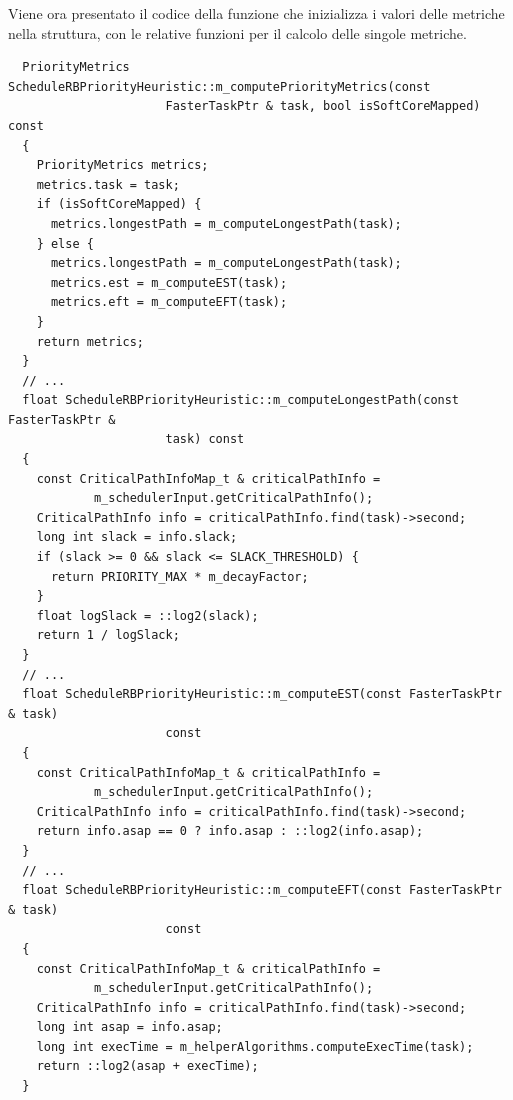 Viene ora presentato il codice della funzione che inizializza i valori delle 
metriche nella struttura, con le relative funzioni per il calcolo delle singole 
metriche.
\newline
\begin{verbatim}
  PriorityMetrics ScheduleRBPriorityHeuristic::m_computePriorityMetrics(const 
                      FasterTaskPtr & task, bool isSoftCoreMapped) const
  {
    PriorityMetrics metrics;
    metrics.task = task;
    if (isSoftCoreMapped) {
      metrics.longestPath = m_computeLongestPath(task);
    } else {
      metrics.longestPath = m_computeLongestPath(task);
      metrics.est = m_computeEST(task);
      metrics.eft = m_computeEFT(task);
    }
    return metrics;
  }
  // ...
  float ScheduleRBPriorityHeuristic::m_computeLongestPath(const FasterTaskPtr & 
                      task) const
  {
    const CriticalPathInfoMap_t & criticalPathInfo = 
            m_schedulerInput.getCriticalPathInfo();
    CriticalPathInfo info = criticalPathInfo.find(task)->second;
    long int slack = info.slack;
    if (slack >= 0 && slack <= SLACK_THRESHOLD) {
      return PRIORITY_MAX * m_decayFactor;
    }
    float logSlack = ::log2(slack);
    return 1 / logSlack;
  }
  // ...
  float ScheduleRBPriorityHeuristic::m_computeEST(const FasterTaskPtr & task) 
                      const
  {
    const CriticalPathInfoMap_t & criticalPathInfo = 
            m_schedulerInput.getCriticalPathInfo();
    CriticalPathInfo info = criticalPathInfo.find(task)->second;
    return info.asap == 0 ? info.asap : ::log2(info.asap);
  }
  // ...
  float ScheduleRBPriorityHeuristic::m_computeEFT(const FasterTaskPtr & task) 
                      const
  {
    const CriticalPathInfoMap_t & criticalPathInfo = 
            m_schedulerInput.getCriticalPathInfo();
    CriticalPathInfo info = criticalPathInfo.find(task)->second;
    long int asap = info.asap;
    long int execTime = m_helperAlgorithms.computeExecTime(task);
    return ::log2(asap + execTime);
  }
\end{verbatim}


